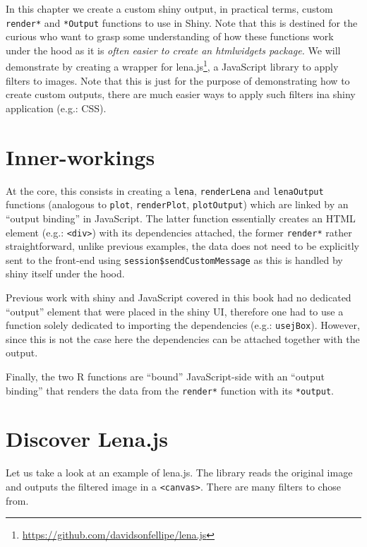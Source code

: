 \documentclass[
]{krantz}
\renewcommand{\href}[2]{#2\footnote{\url{#1}}}
\begin{document}
In this chapter we create a custom shiny output, in practical terms, custom \texttt{render*} and \texttt{*Output} functions to use in Shiny. Note that this is destined for the curious who want to grasp some understanding of how these functions work under the hood as it is \emph{often easier to create an htmlwidgets package.}
We will demonstrate by creating a wrapper for \href{https://github.com/davidsonfellipe/lena.js}{lena.js}, a JavaScript library to apply filters to images. Note that this is just for the purpose of demonstrating how to create custom outputs, there are much easier ways to apply such filters ina shiny application (e.g.: CSS).

\hypertarget{inner-workings}{%
\section{Inner-workings}\label{inner-workings}}

At the core, this consists in creating a \texttt{lena}, \texttt{renderLena} and \texttt{lenaOutput} functions (analogous to \texttt{plot}, \texttt{renderPlot}, \texttt{plotOutput}) which are linked by an ``output binding'' in JavaScript. The latter function essentially creates an HTML element (e.g.: \texttt{\textless{}div\textgreater{}}) with its dependencies attached, the former \texttt{render*} rather straightforward, unlike previous examples, the data does not need to be explicitly sent to the front-end using \texttt{session\$sendCustomMessage} as this is handled by shiny itself under the hood.

Previous work with shiny and JavaScript covered in this book had no dedicated ``output'' element that were placed in the shiny UI, therefore one had to use a function solely dedicated to importing the dependencies (e.g.: \texttt{usejBox}). However, since this is not the case here the dependencies can be attached together with the output.

Finally, the two R functions are ``bound'' JavaScript-side with an ``output binding'' that renders the data from the \texttt{render*} function with its \texttt{*output}.

\hypertarget{discover-lena.js}{%
\section{Discover Lena.js}\label{discover-lena.js}}

Let us take a look at an example of lena.js. The library reads the original image and outputs the filtered image in a \texttt{\textless{}canvas\textgreater{}}. There are many filters to chose from.
\end{document}
